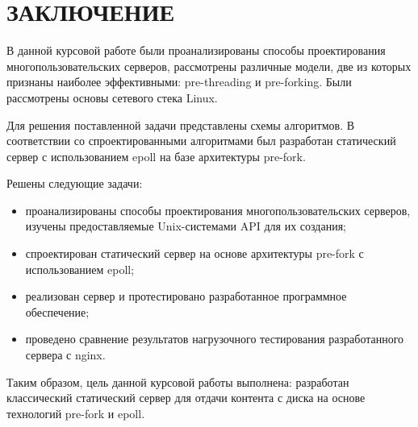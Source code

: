 \section*{ЗАКЛЮЧЕНИЕ}

В данной курсовой работе были проанализированы способы проектирования многопользовательских серверов, рассмотрены различные модели, две из которых признаны наиболее эффективными: pre-threading и pre-forking. Были рассмотрены основы сетевого стека Linux. 

Для решения поставленной задачи представлены схемы алгоритмов. В соответствии со спроектированными алгоритмами был разработан статический сервер с использованием epoll на базе архитектуры pre-fork.

Решены следующие задачи:

\begin{itemize}[label=---]
	
	\item проанализированы способы проектирования многопользовательских серверов, изучены предоставляемые Unix-системами API для их создания;
	
	\item спроектирован статический сервер на основе архитектуры pre-fork с использованием epoll;
	
	\item реализован сервер и протестировано разработанное программное обеспечение;
	
	\item проведено сравнение результатов нагрузочного тестирования разработанного сервера с nginx.
	
\end{itemize}

Таким образом, цель данной курсовой работы выполнена: разработан классический статический сервер для отдачи контента с диска на основе технологий pre-fork и epoll.
\pagebreak